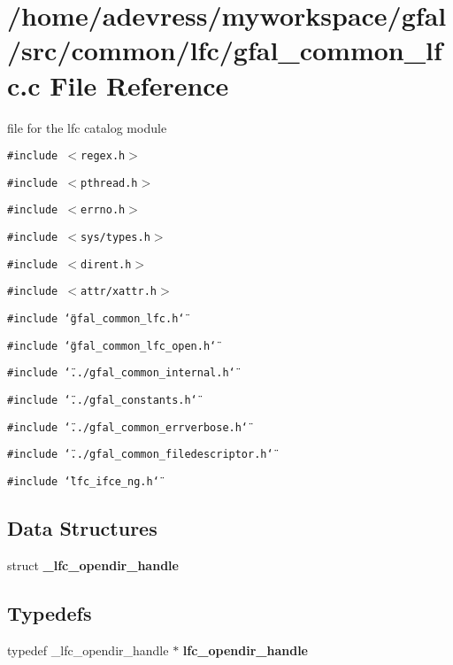 \section{/home/adevress/myworkspace/gfal/src/common/lfc/gfal\_\-common\_\-lfc.c File Reference}
\label{gfal__common__lfc_8c}
file for the lfc catalog module 

{\tt \#include $<$regex.h$>$}\par
{\tt \#include $<$pthread.h$>$}\par
{\tt \#include $<$errno.h$>$}\par
{\tt \#include $<$sys/types.h$>$}\par
{\tt \#include $<$dirent.h$>$}\par
{\tt \#include $<$attr/xattr.h$>$}\par
{\tt \#include \char`\"{}gfal\_\-common\_\-lfc.h\char`\"{}}\par
{\tt \#include \char`\"{}gfal\_\-common\_\-lfc\_\-open.h\char`\"{}}\par
{\tt \#include \char`\"{}../gfal\_\-common\_\-internal.h\char`\"{}}\par
{\tt \#include \char`\"{}../gfal\_\-constants.h\char`\"{}}\par
{\tt \#include \char`\"{}../gfal\_\-common\_\-errverbose.h\char`\"{}}\par
{\tt \#include \char`\"{}../gfal\_\-common\_\-filedescriptor.h\char`\"{}}\par
{\tt \#include \char`\"{}lfc\_\-ifce\_\-ng.h\char`\"{}}\par
\subsection*{Data Structures}
\begin{CompactItemize}
\item 
struct \textbf{\_\-lfc\_\-opendir\_\-handle}
\end{CompactItemize}
\subsection*{Typedefs}
\begin{CompactItemize}
\item 
typedef \_\-lfc\_\-opendir\_\-handle $\ast$ \textbf{lfc\_\-opendir\_\-handle}\label{gfal__common__lfc_8c_5cac68b08f5b09ea46c43428e0fc2cc2}

\end{CompactItemize}
